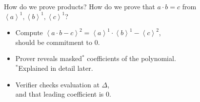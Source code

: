 \begin{frame}{How do we prove products?}
  How do we prove that $a\cdot b=c$ from $\left<a\right>^1,\left<b\right>^1,\left<c\right>^1$?
  \pause
  \begin{itemize}
    \item Compute $\left<a{\cdot}b-c\right>^2=\left<a\right>^1{\cdot}\left<b\right>^1-\left<c\right>^2$, \\
      should be commitment to 0.
    \pause
    \item Prover reveals masked$^\ast$ coefficients of the polynomial.\\[-0.2em]
      {\footnotesize $^\ast$Explained in detail later.}
    \pause
    \item Verifier checks evaluation at $\Delta$,\\
    and that leading coefficient is 0.
  \end{itemize}
\end{frame}
